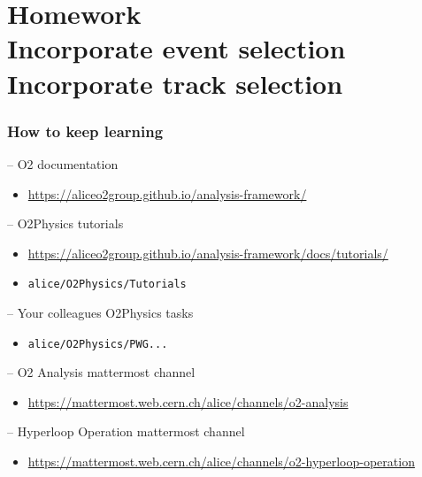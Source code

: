 \documentclass[14pt,aspectratio=169,t]{beamer}
\begin{document}
\section{Homework\\Incorporate event selection\\Incorporate track selection}

\begin{frame}
  \frametitle{How to keep learning}
  \small
  -- {\color{blue} O2 documentation}\par
  \begin{itemize}
    \vspace{-0.1in}
    \item \href{https://aliceo2group.github.io/analysis-framework/}{https://aliceo2group.github.io/analysis-framework/}
  \end{itemize}
  -- {\color{blue} O2Physics tutorials} 
  \begin{itemize}
    \vspace{-0.1in}
    \item \href{https://aliceo2group.github.io/analysis-framework/docs/tutorials/}{https://aliceo2group.github.io/analysis-framework/docs/tutorials/}
    \vspace{-0.1in}
    \item \texttt{alice/O2Physics/Tutorials}
  \end{itemize}
  -- {\color{blue} Your colleagues O2Physics tasks} 
  \begin{itemize}
    \vspace{-0.1in}
    \item \texttt{alice/O2Physics/PWG...}
  \end{itemize}
  -- {\color{blue} O2 Analysis mattermost channel}\par
  \begin{itemize}
    \vspace{-0.1in}
    \item \href{https://mattermost.web.cern.ch/alice/channels/o2-analysis}{https://mattermost.web.cern.ch/alice/channels/o2-analysis}
  \end{itemize}
  -- {\color{blue} Hyperloop Operation mattermost channel}\par
  \begin{itemize}
    \vspace{-0.1in}
    \item \href{https://mattermost.web.cern.ch/alice/channels/o2-hyperloop-operation}{https://mattermost.web.cern.ch/alice/channels/o2-hyperloop-operation}
  \end{itemize}

   
\end{frame}
\end{document}
